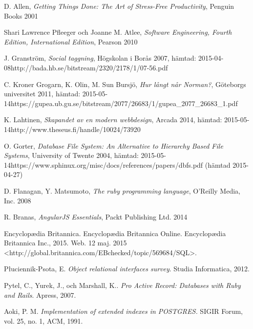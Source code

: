 \documentclass[a4paper,12pt,oneside,final]{extbook}
\begin{document}
\begin{thebibliography}{99}

  D. Allen, \emph{Getting Things Done: The Art of Stress-Free Productivity}, Penguin Books 2001

  Shari Lawrence Pfleeger och Joanne M. Atlee, \emph{Software Engineering, Fourth Edition, International Edition}, Pearson 2010

  J. Granström, \emph{Social taggning}, Högskolan i Borås 2007, hämtad: 2015-04-08\newline http://bada.hb.se/bitstream/2320/2178/1/07-56.pdf

  C. Kroner Grogarn, K. Olin, M. Sun Bursjö, \emph{Hur långt når Norman?}, Göteborgs universitet 2011, hämtad: 2015-05-14\newline https://gupea.ub.gu.se/bitstream/2077/26683/1/gupea\_2077\_26683\_1.pdf

  K. Lahtinen, \emph{Skapandet av en modern webbdesign}, Arcada 2014, hämtad: 2015-05-14\newline http://www.theseus.fi/handle/10024/73920

  O. Gorter, \emph{Database File System: An Alternative to Hierarchy Based File Systems}, University of Twente 2004, hämtad: 2015-05-14\newline https://www.sphinux.org/misc/docs/references/papers/dbfs.pdf (hämtad 2015-04-27)

  D. Flanagan, Y. Matsumoto, \emph{The ruby programming language}, O'Reilly Media, Inc. 2008

  R. Branas, \emph{AngularJS Essentials}, Packt Publishing Ltd. 2014

  Encyclopædia Britannica. Encyclopædia Britannica Online. Encyclopædia Britannica Inc., 2015. Web. 12 maj. 2015 <http://global.britannica.com/EBchecked/topic/569684/SQL>.

  Płuciennik-Psota, E. \emph{Object relational interfaces survey}. Studia Informatica, 2012.

  Pytel, C., Yurek, J., och Marshall, K.. \emph{Pro Active Record: Databases with Ruby and Rails}. Apress, 2007.

  Aoki, P. M. \emph{Implementation of extended indexes in POSTGRES.} SIGIR Forum, vol. 25, no. 1, ACM, 1991.


\end{thebibliography}
\end{document}
